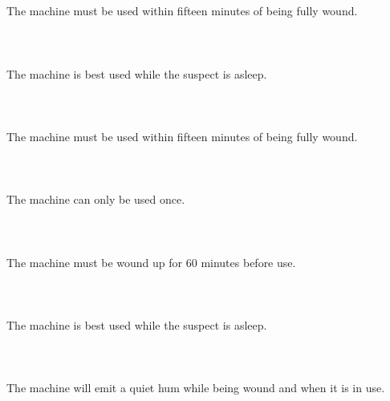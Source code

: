 \documentclass{article}
\begin{document}
    \section{}
    The machine must be used within fifteen minutes of being fully wound.\\\\ 
    \newpage
    
    \section{}
    The machine is best used while the suspect is asleep.\\\\ 
    \newpage
    
    \section{}
    The machine must be used within fifteen minutes of being fully wound.\\\\ 
    \newpage
    
    \section{}
    The machine can only be used once.\\\\ 
    \newpage
    
    \section{}
    The machine must be wound up for 60 minutes before use.\\\\ 
    \newpage
    
    \section{}
    The machine is best used while the suspect is asleep.\\\\ 
    \newpage
    
    \section{}
    The machine will emit a quiet hum while being wound and when it is in use.\\\\ 
    \newpage
    
\end{document}
